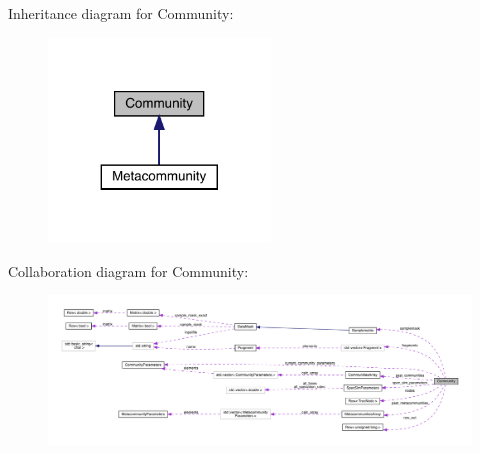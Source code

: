 Inheritance diagram for Community\+:
\nopagebreak
\begin{figure}[H]
\begin{center}
\leavevmode
\includegraphics[width=167pt]{class_community__inherit__graph}
\end{center}
\end{figure}


Collaboration diagram for Community\+:\nopagebreak
\begin{figure}[H]
\begin{center}
\leavevmode
\includegraphics[width=350pt]{class_community__coll__graph}
\end{center}
\end{figure}
